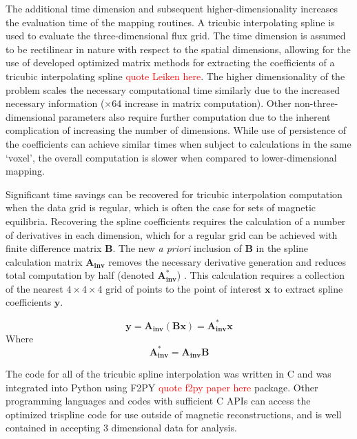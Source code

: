 \documentclass[12pt,floatfix,showpacs]{revtex4-1}
\newcommand{\note}[1]{\textcolor{red}{#1}}
\newcommand{\gnote}[1]{\marginpar{\scriptsize\textcolor{red}{#1}}}
\begin{document}
The additional time dimension and subsequent higher-dimensionality increases the evaluation time of the mapping routines. A tricubic interpolating spline is used to evaluate the three-dimensional flux grid. The time dimension is assumed to be rectilinear in nature with respect to the spatial dimensions\gnote{I'm not sure I understand this statement, can you clarify?}, allowing for the use of developed optimized matrix methods for extracting the coefficients of a tricubic interpolating spline \note{quote Leiken here}. The higher dimensionality of the problem scales the necessary computational time similarly due to the increased necessary information ($\times64$ increase in matrix computation). Other non-three-dimensional parameters also require further computation due to the inherent complication of increasing the number of dimensions. While use of persistence of the coefficients can achieve similar times when subject to calculations in the same `voxel', the overall computation is slower when compared to lower-dimensional mapping.

Significant time savings can be recovered for tricubic interpolation computation when the data grid is regular, which is often the case for sets of magnetic equilibria. Recovering the spline coefficients requires the calculation of a number of derivatives in each dimension, which for a regular grid can be achieved with finite difference matrix $\boldsymbol{B}$. The new \emph{a priori} inclusion of $\boldsymbol{B}$ in the spline calculation matrix $\boldsymbol{A_{inv}}$ removes the necessary derivative generation and reduces total computation by half (denoted 
$\boldsymbol{A_{inv}^*}$) . This calculation requires a collection of the nearest $4\times4\times4$ grid of points to the point of interest $\boldsymbol{x}$ to extract spline coefficients $\boldsymbol{y}$.

\begin{equation}
\boldsymbol{y} = \boldsymbol{A_{inv}} ( \boldsymbol{B} \boldsymbol{x}) = \boldsymbol{A_{inv}^*}\boldsymbol{x}
\end{equation}
Where
\begin{equation}
\boldsymbol{A_{inv}^*} = \boldsymbol{A_{inv}}\boldsymbol{B} 
\end{equation}

The code for all of the tricubic spline interpolation was written in C and was integrated into Python using F2PY \note{quote f2py paper here} package. Other programming languages and codes with sufficient C APIs can access the optimized trispline code for use outside of magnetic reconstructions, and is well contained in accepting 3 dimensional data for analysis.
\end{document}
